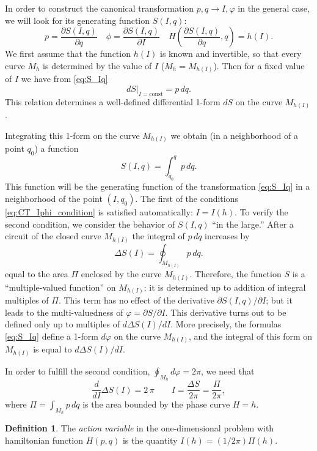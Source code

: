 \documentclass[leqno]{book}
\numberwithin{equation}{section}
\theoremstyle{plain}
\theoremstyle{definition}
\newtheorem*{defn*}{Definition}
\theoremstyle{remark}
\theoremstyle{smallcap}
\numberwithin{prob}{section}
\begin{document}
In order to construct the canonical transformation $p, q \rightarrow I, \varphi$
in the general case, we will look for its generating function $S(I, q)$:
\begin{equation}
  p = \frac{ \partial S(I, q) } { \partial q }
  \quad
  \phi = \frac{ \partial S(I, q) } { \partial I }
  \quad
  H\left(
    \frac{ \partial S(I, q) } { \partial q },
    q
  \right)
  = h(I).
  \label{eq:S_Iq}
\end{equation}
We first assume that the function $h(I)$ is known
and invertible, so that every curve $M_h$ is determined
by the value of $I$ ($M_h = M_{h(I)}$).
%
Then for a fixed value of $I$
we have from \eqref{eq:S_Iq}
$$
dS\big|_{I = \mathrm{const}} = p \, dq.
$$
This relation determines a well-defined differential 1-form $dS$
on the curve $M_{h(I)}$.

Integrating this 1-form on the curve $M_{h(I)}$
we obtain (in a neighborhood of a point $q_0$)
a function
$$
S(I, q) = \int_{q_0}^q p \, dq.
$$
This function will be the generating function
of the transformation \eqref{eq:S_Iq}
in a neighborhood of the point $(I, q_0)$.
%
The first of the conditions \eqref{eq:CT_Iphi_condition}
is satisfied automatically: $I = I(h)$.
%
To verify the second condition,
we consider the behavior of $S(I, q)$ ``in the large.''
%
After a circuit of the closed curve $M_{h(I)}$
the integral of $p\, dq$ increases by
$$
\Delta S(I) = \oint_{M_{h(I)}} p \, dq.
$$
equal to the area $\Pi$ enclosed by the curve $M_{h(I)}$.
%
Therefore, the function $S$ is a ``multiple-valued function''
on $M_{h(I)}$:
it is determined up to addition of integral multiples of $\Pi$.
%
This term has no effect of the derivative
$\partial S(I, q)/\partial I$;
but it leads to the multi-valuedness of $\varphi = \partial S/\partial I$.
%
This derivative turns out to be defined only up to multiples of
$d \Delta S(I) / dI$.
%
More precisely,
the formulas \eqref{eq:S_Iq}
define a 1-form $d\varphi$ on the curve $M_{h(I)}$,
and the integral of this form on $M_{h(I)}$
is equal to $d\Delta S(I)/dI$.

In order to fulfill the second condition,
$\oint_{M_{h}} d\varphi = 2 \pi$,
we need that
$$
\frac{d}{dI} \Delta S(I) = 2 \, \pi
\qquad
I = \frac{ \Delta S  }{ 2 \pi }
= \frac{ \Pi } { 2 \pi },
$$
where
$\Pi = \int_{M_h} p \, dq$
is the area bounded by the phase curve $H = h$.

\begin{defn*}
  The \emph{action variable} in the one-dimensional problem
  with hamiltonian function $H(p, q)$
  is the quantity $I(h) = (1/2\pi) \Pi(h)$.
\end{defn*}
\end{document}
